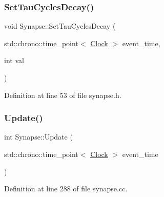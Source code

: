 \mbox{\label{class_synapse_a5bbee6bb7dc49c90b7c3413d02e06cc8}} 
\subsubsection{\texorpdfstring{Set\+Tau\+Cycles\+Decay()}{SetTauCyclesDecay()}}
{\footnotesize\ttfamily void Synapse\+::\+Set\+Tau\+Cycles\+Decay (\begin{DoxyParamCaption}\item[{std\+::chrono\+::time\+\_\+point$<$ \hyperlink{universe_8h_a0ef8d951d1ca5ab3cfaf7ab4c7a6fd80}{Clock} $>$}]{event\+\_\+time,  }\item[{int}]{val }\end{DoxyParamCaption})\hspace{0.3cm}{\ttfamily [inline]}}



Definition at line 53 of file synapse.\+h.

\mbox{\label{class_synapse_a37c64f579846cf18d09b3b262d566ffe}} 
\subsubsection{\texorpdfstring{Update()}{Update()}}
{\footnotesize\ttfamily int Synapse\+::\+Update (\begin{DoxyParamCaption}\item[{std\+::chrono\+::time\+\_\+point$<$ \hyperlink{universe_8h_a0ef8d951d1ca5ab3cfaf7ab4c7a6fd80}{Clock} $>$}]{event\+\_\+time }\end{DoxyParamCaption})}



Definition at line 288 of file synapse.\+cc.

